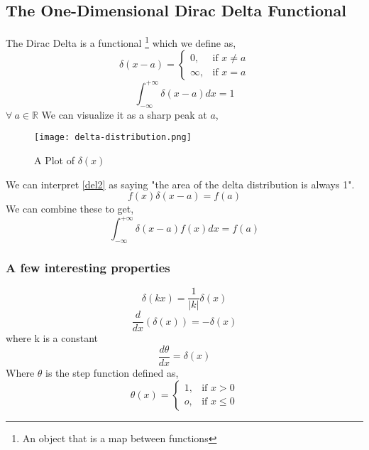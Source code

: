 \subsection{The One-Dimensional Dirac Delta Functional}
The Dirac Delta is a functional \footnote{An object that is a map between functions} which we define as,
\begin{equation} \label{deltadef}
\delta(x-a)= 
\begin{cases}
0, & \text{if } x \neq a\\
\infty,              & \text{if } x = a
\end{cases}
\end{equation}
\begin{equation}
\int_{- \infty}^{+ \infty} \delta(x-a) dx = 1
\label{del2}
\end{equation}
$\forall \  a \in \mathbb{R}$
We can visualize it as a sharp peak at $a$,
\begin{figure}
	\centering
	\texttt{[image: delta-distribution.png]}
	\caption{A Plot of $\delta(x)$}
\end{figure}
We can interpret \ref{del2} as saying "the area of the delta distribution is always 1".
\begin{equation}
f(x)\delta(x - a ) = f(a)
\end{equation}
We can combine these to get,
\begin{equation}
\int_{- \infty}^{+ \infty} \delta(x-a) f(x) dx = f(a)
\end{equation}
\subsubsection{A few interesting properties}
\begin{equation}
\delta(kx) = \frac{1}{|k|}\delta(x)
\end{equation}
\begin{equation}
\frac{d}{dx}(\delta(x)) = -\delta(x)
\end{equation}
where k is a constant
\begin{equation}
\frac{d \theta}{dx} = \delta(x)
\end{equation}
Where $\theta$ is the step function defined as,
\begin{equation}
\theta(x)= 
\begin{cases}
1, & \text{if } x > 0\\
o,              & \text{if } x \leq 0
\end{cases}
\end{equation}

